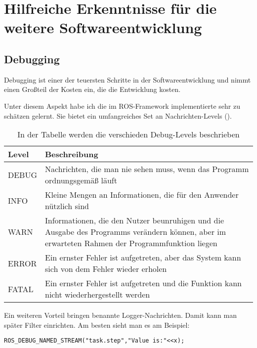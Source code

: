 \chapter{Hilfreiche Erkenntnisse für die weitere Softwareentwicklung}\label{app_1}
\section{Debugging}
\label{debug}
Debugging ist einer der teuersten Schritte in der Softwareentwicklung und nimmt einen Großteil der Kosten ein, die die Entwicklung kosten.

Unter diesem Aspekt habe ich die im ROS-Framework implementierte  sehr zu schätzen gelernt.
Sie bietet ein umfangreiches Set an Nachrichten-Levels ().

\begin{table}
\begin{center}
\begin{tabular}{p{3cm}  p{10cm}}
\textbf{Level} & \textbf{Beschreibung} \\ \hline	
	DEBUG & Nachrichten, die man nie sehen muss, wenn das Programm ordnungsgemäß läuft  \\ \hline
	INFO & Kleine Mengen an Informationen, die für den Anwender nützlich sind \\ \hline
	WARN & Informationen, die den Nutzer beunruhigen und die Ausgabe des Programms verändern können, aber im erwarteten Rahmen der Programmfunktion liegen \\ \hline
	ERROR & Ein ernster Fehler ist aufgetreten, aber das System kann sich von dem Fehler wieder erholen \\ \hline
	FATAL & Ein ernster Fehler ist aufgetreten und die Funktion kann nicht wiederhergestellt werden \\ 

\end{tabular}
\end{center}
\caption{\label{debugVerbosity}In der Tabelle werden die verschieden Debug-Levels beschrieben }
\end{table}
Ein weiteren Vorteil bringen benannte Logger-Nachrichten. 
Damit kann man später Filter einrichten. 
Am besten sieht man es am Beispiel:

\begin{verbatim}
ROS_DEBUG_NAMED_STREAM("task.step","Value is:"<<x);
\end{verbatim}

